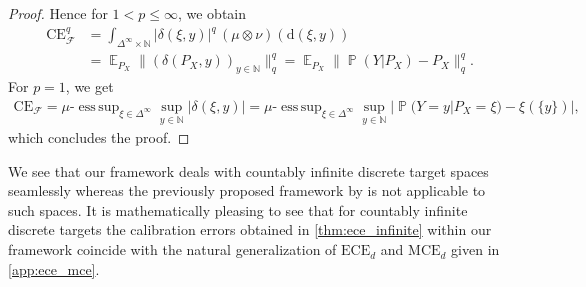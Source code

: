 \documentclass{article}
\DeclareMathOperator{\Prob}{\mathbb{P}}
\DeclareMathOperator{\Exp}{\mathbb{E}}
\DeclareMathOperator*{\esssup}{ess\,sup}
\begin{document}
\begin{proof}
    Hence for $1 < p \leq \infty$, we obtain
    \begin{equation*}
        \begin{split}
            \mathrm{CE}_{\mathcal{F}}^q &= \int_{\Delta^\infty \times \mathbb{N}} |\delta(\xi, y)|^{q} \,(\mu \otimes \nu)(\mathrm{d}(\xi, y)) \\
            &= \Exp_{P_X} \|(\delta(P_X, y))_{y \in \mathbb{N}}\|_q^q = \Exp_{P_X} \|\Prob(Y |P_X) - P_X\|_q^q.
        \end{split}
    \end{equation*}
    For $p = 1$, we get
    \begin{equation*}
        \begin{split}
            \mathrm{CE}_{\mathcal{F}} = \mu\text{-}\esssup_{\xi \in \Delta^{\infty}} \sup_{y \in \mathbb{N}} |\delta(\xi, y)| = \mu\text{-}\esssup_{\xi \in \Delta^{\infty}} \sup_{y \in \mathbb{N}} |\Prob(Y=y|P_X=\xi) - \xi(\{y\})|,
        \end{split}
    \end{equation*}
    which concludes the proof.
\end{proof}

We see that our framework deals with countably infinite discrete target spaces seamlessly whereas the previously
proposed framework by \citet{Widmann2019} is not applicable to such spaces. It is mathematically pleasing to see
that for countably infinite discrete targets the calibration errors obtained in \cref{thm:ece_infinite} within
our framework coincide with the natural generalization of $\mathrm{ECE}_d$ and $\mathrm{MCE}_d$ given in
\cref{app:ece_mce}.
\end{document}
